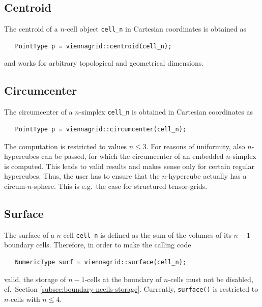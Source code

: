   \subsection{Centroid}
  The centroid of a $n$-cell object \lstinline|cell_n| in Cartesian coordinates is obtained as
  \begin{lstlisting}
   PointType p = viennagrid::centroid(cell_n);
  \end{lstlisting}
  and works for arbitrary topological and geometrical dimensions.

  \subsection{Circumcenter}
  The circumcenter of a $n$-simplex \lstinline|cell_n| is obtained in Cartesian coordinates as
  \begin{lstlisting}
   PointType p = viennagrid::circumcenter(cell_n);
  \end{lstlisting}
  The computation is restricted to values $n \leq 3$. For reasons of uniformity, also $n$-hypercubes can be passed, for which the circumcenter of an embedded $n$-simplex is computed. This leads to valid results and makes sense only for certain regular hypercubes.
  Thus, the user has to ensure that the $n$-hypercube actually has a circum-$n$-sphere. This is e.g.~the case for structured tensor-grids.


  \subsection{Surface}
  The surface of a $n$-cell \lstinline|cell_n| is defined as the sum of the volumes of its $n-1$ boundary cells. Therefore, in order to make the calling code
  \begin{lstlisting}
   NumericType surf = viennagrid::surface(cell_n);
  \end{lstlisting}
  valid, the storage of $n-1$-cells at the boundary of $n$-cells must not be disabled, cf.~Section \ref{subsec:boundary-ncells-storage}.
  Currently, \lstinline|surface()| is restricted to $n$-cells with $n \leq 4$.


